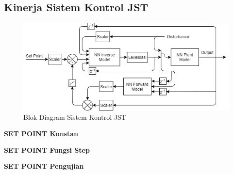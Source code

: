 \subsection{Kinerja Sistem Kontrol JST}

\begin{figure}[!h]
	\centering
	\includegraphics[width=1\textwidth]{figures/ControlDesignDiagram}
	\caption{Blok Diagram Sistem Kontrol JST}
	\label{fig:5:ConstrolSystemBlockDiagram}
\end{figure}

\noindent \textbf{SET POINT Konstan}


\noindent \textbf{SET POINT Fungsi Step}

\noindent \textbf{SET POINT Pengujian}